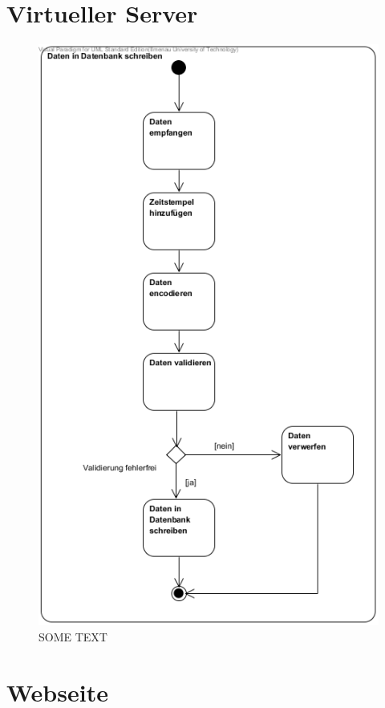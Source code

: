 \documentclass[fontsize = 12pt, paper = a4]{scrreprt}
\begin{document}
\section{Virtueller Server}

\begin{figure}[h]
\centering
\includegraphics[scale = 0.70]{activity_vserver.png}
\caption{SOME TEXT}
\end{figure}

\section{Webseite}
\end{document}
